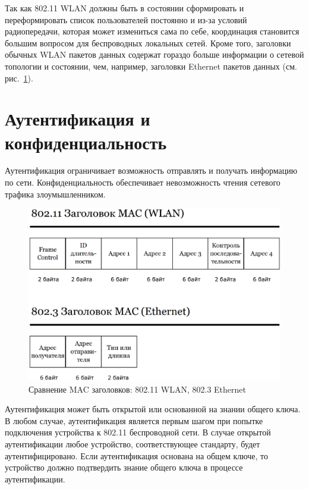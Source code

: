 Так как 802.11 WLAN должны быть в состоянии сформировать и переформировать
список пользователей постоянно и из-за условий радиопередачи, которая может
измениться сама по себе, координация становится большим вопросом для
беспроводных локальных сетей. Кроме того, заголовки обычных WLAN пакетов данных
содержат гораздо больше информации о сетевой топологии и состоянии, чем,
например, заголовки Ethernet пакетов данных (см.
рис.~\ref{fig:compare_mac_wlan_vs_ethernet}).

\section{Аутентификация и конфиденциальность}

Аутентификация ограничивает возможность отправлять и получать информацию по сети.
Конфиденциальность обеспечивает невозможность чтения сетевого трафика
злоумышленником.

\begin{figure}
    \includegraphics[width=1\textwidth]{graphics/compare_mac_wlan_vs_ethernet.eps}
    \caption{Сравнение MAC заголовков: 802.11 WLAN, 802.3 Ethernet}
    \label{fig:compare_mac_wlan_vs_ethernet}
\end{figure}

Аутентификация может быть открытой или основанной на знании общего ключа. В
любом случае, аутентификация является первым шагом при попытке подключения
устройства к 802.11 беспроводной сети. В случае открытой аутентификации любое
устройство, соответствующее стандарту, будет аутентифицировано. Если
аутентификация основана на общем ключе, то устройство должно подтвердить знание
общего ключа в процессе аутентификации.

